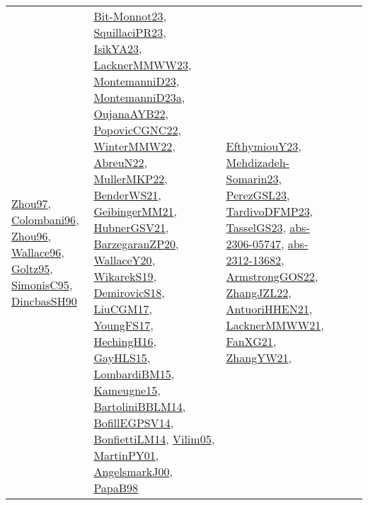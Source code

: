 {\begin{longtable}{lp{3cm}>{\raggedright}p{6cm}>{\raggedright}p{6cm}p{8cm}}
\href{articles/Zhou97.pdf}{Zhou97}\cite{Zhou97}, \href{papers/Colombani96.pdf}{Colombani96}\cite{Colombani96}, \href{papers/Zhou96.pdf}{Zhou96}\cite{Zhou96}, \href{articles/Wallace96.pdf}{Wallace96}\cite{Wallace96}, \href{papers/Goltz95.pdf}{Goltz95}\cite{Goltz95}, \href{papers/SimonisC95.pdf}{SimonisC95}\cite{SimonisC95}, \href{articles/DincbasSH90.pdf}{DincbasSH90}\cite{DincbasSH90} & \href{papers/Bit-Monnot23.pdf}{Bit-Monnot23}\cite{Bit-Monnot23}, \href{papers/SquillaciPR23.pdf}{SquillaciPR23}\cite{SquillaciPR23}, \href{articles/IsikYA23.pdf}{IsikYA23}\cite{IsikYA23}, \href{articles/LacknerMMWW23.pdf}{LacknerMMWW23}\cite{LacknerMMWW23}, \href{articles/MontemanniD23.pdf}{MontemanniD23}\cite{MontemanniD23}, \href{articles/MontemanniD23a.pdf}{MontemanniD23a}\cite{MontemanniD23a}, \href{papers/OujanaAYB22.pdf}{OujanaAYB22}\cite{OujanaAYB22}, \href{papers/PopovicCGNC22.pdf}{PopovicCGNC22}\cite{PopovicCGNC22}, \href{papers/WinterMMW22.pdf}{WinterMMW22}\cite{WinterMMW22}, \href{articles/AbreuN22.pdf}{AbreuN22}\cite{AbreuN22}, \href{articles/MullerMKP22.pdf}{MullerMKP22}\cite{MullerMKP22}, \href{papers/BenderWS21.pdf}{BenderWS21}\cite{BenderWS21}, \href{papers/GeibingerMM21.pdf}{GeibingerMM21}\cite{GeibingerMM21}, \href{articles/HubnerGSV21.pdf}{HubnerGSV21}\cite{HubnerGSV21}, \href{papers/BarzegaranZP20.pdf}{BarzegaranZP20}\cite{BarzegaranZP20}, \href{articles/WallaceY20.pdf}{WallaceY20}\cite{WallaceY20}, \href{articles/WikarekS19.pdf}{WikarekS19}\cite{WikarekS19}, \href{papers/DemirovicS18.pdf}{DemirovicS18}\cite{DemirovicS18}, \href{papers/LiuCGM17.pdf}{LiuCGM17}\cite{LiuCGM17}, \href{papers/YoungFS17.pdf}{YoungFS17}\cite{YoungFS17}, \href{papers/HechingH16.pdf}{HechingH16}\cite{HechingH16}, \href{papers/GayHLS15.pdf}{GayHLS15}\cite{GayHLS15}, \href{papers/LombardiBM15.pdf}{LombardiBM15}\cite{LombardiBM15}, \href{articles/Kameugne15.pdf}{Kameugne15}\cite{Kameugne15}, \href{papers/BartoliniBBLM14.pdf}{BartoliniBBLM14}\cite{BartoliniBBLM14}, \href{papers/BofillEGPSV14.pdf}{BofillEGPSV14}\cite{BofillEGPSV14}, \href{papers/BonfiettiLM14.pdf}{BonfiettiLM14}\cite{BonfiettiLM14}, \href{papers/Vilim05.pdf}{Vilim05}\cite{Vilim05}, \href{articles/MartinPY01.pdf}{MartinPY01}\cite{MartinPY01}, \href{papers/AngelsmarkJ00.pdf}{AngelsmarkJ00}\cite{AngelsmarkJ00}, \href{articles/PapaB98.pdf}{PapaB98}\cite{PapaB98} & \href{papers/EfthymiouY23.pdf}{EfthymiouY23}\cite{EfthymiouY23}, \href{papers/Mehdizadeh-Somarin23.pdf}{Mehdizadeh-Somarin23}\cite{Mehdizadeh-Somarin23}, \href{papers/PerezGSL23.pdf}{PerezGSL23}\cite{PerezGSL23}, \href{papers/TardivoDFMP23.pdf}{TardivoDFMP23}\cite{TardivoDFMP23}, \href{papers/TasselGS23.pdf}{TasselGS23}\cite{TasselGS23}, \href{articles/abs-2306-05747.pdf}{abs-2306-05747}\cite{abs-2306-05747}, \href{articles/abs-2312-13682.pdf}{abs-2312-13682}\cite{abs-2312-13682}, \href{papers/ArmstrongGOS22.pdf}{ArmstrongGOS22}\cite{ArmstrongGOS22}, \href{papers/ZhangJZL22.pdf}{ZhangJZL22}\cite{ZhangJZL22}, \href{papers/AntuoriHHEN21.pdf}{AntuoriHHEN21}\cite{AntuoriHHEN21}, \href{papers/LacknerMMWW21.pdf}{LacknerMMWW21}\cite{LacknerMMWW21}, \href{articles/FanXG21.pdf}{FanXG21}\cite{FanXG21}, \href{articles/ZhangYW21.pdf}{ZhangYW21}\cite{ZhangYW21}, 
\end{longtable}}
